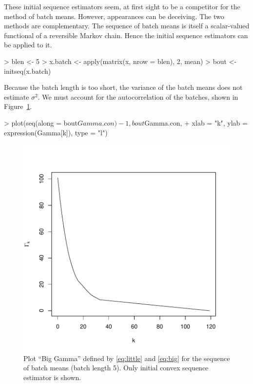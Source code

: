 \documentclass{article}
\begin{document}
These initial sequence estimators seem, at first sight to be a competitor
for the method of batch means.  However, appearances can be deceiving.
The two methods are complementary.  The sequence of batch means is itself
a scalar-valued functional of a reversible Markov chain.  Hence the
initial sequence estimators can be applied to it.
\begin{Schunk}
\begin{Sinput}
> blen <- 5
> x.batch <- apply(matrix(x, nrow = blen), 2, mean)
> bout <- initseq(x.batch)
\end{Sinput}
\end{Schunk}
Because the batch length is too short, the variance of the batch means
does not estimate $\sigma^2$.  We must account for the autocorrelation
of the batches, shown in Figure~\ref{fig:gambat}.
\begin{Schunk}
\begin{Sinput}
> plot(seq(along = bout$Gamma.con) - 1, bout$Gamma.con,
+         xlab = "k", ylab = expression(Gamma[k]), type = "l")
\end{Sinput}
\end{Schunk}
\begin{figure}
\begin{center}
\includegraphics{comments_lme-figgambat}
\end{center}
\caption{Plot ``Big Gamma'' defined by \eqref{eq:little} and \eqref{eq:big}
for the sequence of batch means (batch length 5).
Only initial convex sequence estimator is shown.}
\label{fig:gambat}
\end{figure}
\end{document}
